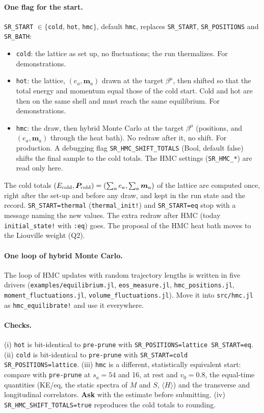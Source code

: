 \documentclass[11pt,aps,preprint,nofootinbib,superscriptaddress,tightenlines]{revtex4-2}
\let\oldparagraph\paragraph
\renewcommand{\paragraph}{\par\bigskip\oldparagraph}
\newcommand{\ask}{\textbf{Ask}}
\begin{document}
\paragraph{One flag for the start.}  \texttt{SR\_START} $\in\{$\texttt{cold}, \texttt{hot}, \texttt{hmc}$\}$, default \texttt{hmc}, replaces
\texttt{SR\_START}, \texttt{SR\_POSITIONS} and \texttt{SR\_BATH}:
\begin{itemize}
\item \texttt{cold}: the lattice as set up, no fluctuations; the run thermalizes.  For demonstrations.
\item \texttt{hot}: the lattice, $(e_a,\bm m_a)$ drawn at the target $\beta^\mu$, then shifted so that the total energy and momentum equal those of
  the cold start.  Cold and hot are then on the same shell and must reach the same equilibrium.  For demonstrations.
\item \texttt{hmc}: the draw, then hybrid Monte Carlo at the target $\beta^\mu$ (positions, and $(e_a,\bm m_a)$ through the heat bath).  No
  redraw after it, no shift.  For production.  A debugging flag \texttt{SR\_HMC\_SHIFT\_TOTALS} (Bool, default false) shifts the final sample
  to the cold totals.  The HMC settings (\texttt{SR\_HMC\_*}) are read only here.
\end{itemize}
The cold totals $(E_{\rm cold},\bm P_{\rm cold})=(\sum_a e_a,\sum_a \bm m_a)$ of the lattice are computed once, right after the set-up and before
any draw, and kept in the run state and the record.  \texttt{SR\_START=thermal} (\texttt{thermal\_init!}) and \texttt{SR\_START=eq} stop with a
message naming the new values.  The extra redraw after HMC (today \texttt{initial\_state!} with \texttt{:eq}) goes.  The proposal of the HMC heat
bath moves to the Liouville weight (Q2).

\paragraph{One loop of hybrid Monte Carlo.}  The loop of HMC updates with random trajectory lengths is written in five drivers
(\nolinkurl{examples/equilibrium.jl}, \nolinkurl{eos_measure.jl}, \nolinkurl{hmc_positions.jl}, \nolinkurl{moment_fluctuations.jl},
\nolinkurl{volume_fluctuations.jl}).  Move it into \nolinkurl{src/hmc.jl} as \texttt{hmc\_equilibrate!} and use it everywhere.

\paragraph{Checks.}  (i) \texttt{hot} is bit-identical to \texttt{pre-prune} with \texttt{SR\_POSITIONS=lattice SR\_START=eq}.  (ii)
\texttt{cold} is bit-identical to \texttt{pre-prune} with \texttt{SR\_START=cold SR\_POSITIONS=lattice}.  (iii) \texttt{hmc} is a different,
statistically equivalent start: compare with \texttt{pre-prune} at $s_a=54$ and 16, at rest and $v_0=0.8$, the equal-time quantities (KE/eq,
the static spectra of $M$ and $S$, $\langle H\rangle$) and the transverse and longitudinal correlators.  \ask{} with the estimate before
submitting.  (iv) \texttt{SR\_HMC\_SHIFT\_TOTALS=true} reproduces the cold totals to rounding.
\end{document}
